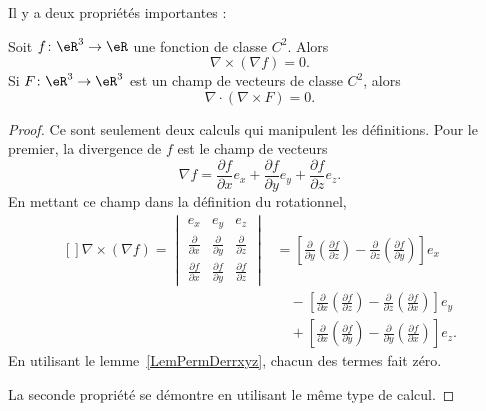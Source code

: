 Il y a deux propriétés importantes :
\begin{theorem}
	Soit \( f\colon \eR^3\to \eR\) une fonction de classe \( C^2\). Alors
	\begin{equation}
		\nabla\times(\nabla f)=0.
	\end{equation}
	Si \( F\colon \eR^3\to \eR^3\) est un champ de vecteurs de classe \( C^2\), alors
	\begin{equation}
		\nabla\cdot(\nabla\times F)=0.
	\end{equation}
\end{theorem}

\begin{proof}
	Ce sont seulement deux calculs qui manipulent les définitions. Pour le premier, la divergence de \( f\) est le champ de vecteurs
	\begin{equation}
		\nabla f=\frac{ \partial f }{ \partial x }e_x+\frac{ \partial f }{ \partial y }e_y+\frac{ \partial f }{ \partial z }e_z.
	\end{equation}
	En mettant ce champ dans la définition du rotationnel,
	\begin{equation}
		\begin{aligned}[]
			\nabla\times(\nabla f)=\begin{vmatrix}
				                       e_x                               & e_y                               & e_z                               \\
				                       \frac{ \partial  }{ \partial x }  & \frac{ \partial  }{ \partial y }  & \frac{ \partial  }{ \partial z }  \\
				                       \frac{ \partial f }{ \partial x } & \frac{ \partial f }{ \partial y } & \frac{ \partial f }{ \partial z }
			                       \end{vmatrix}
			 & =\left[ \frac{ \partial  }{ \partial y }\left( \frac{ \partial f }{ \partial z } \right)-\frac{ \partial  }{ \partial z }\left( \frac{ \partial f }{ \partial y } \right) \right]e_x       \\
			 & \quad-\left[ \frac{ \partial  }{ \partial x }\left( \frac{ \partial f }{ \partial z } \right)-\frac{ \partial  }{ \partial z }\left( \frac{ \partial f }{ \partial x } \right) \right]e_y  \\
			 & \quad+\left[ \frac{ \partial  }{ \partial x }\left( \frac{ \partial f }{ \partial y } \right)-\frac{ \partial  }{ \partial y }\left( \frac{ \partial f }{ \partial x } \right) \right]e_z.
		\end{aligned}
	\end{equation}
	En utilisant le lemme~\ref{LemPermDerrxyz}, chacun des termes fait zéro.

	La seconde propriété se démontre en utilisant le même type de calcul.
\end{proof}

